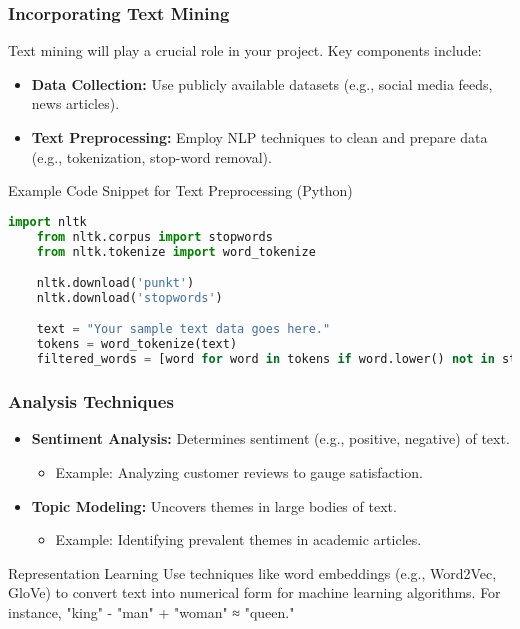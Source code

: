 \documentclass[aspectratio=169]{beamer}
\begin{document}
\begin{frame}[fragile]
    \frametitle{Incorporating Text Mining}
    Text mining will play a crucial role in your project. Key components include:
    \begin{itemize}
        \item \textbf{Data Collection:} Use publicly available datasets (e.g., social media feeds, news articles).
        \item \textbf{Text Preprocessing:} Employ NLP techniques to clean and prepare data (e.g., tokenization, stop-word removal).
    \end{itemize}

    \begin{block}{Example Code Snippet for Text Preprocessing (Python)}
    \begin{lstlisting}[language=Python]
    import nltk
    from nltk.corpus import stopwords
    from nltk.tokenize import word_tokenize

    nltk.download('punkt')
    nltk.download('stopwords')

    text = "Your sample text data goes here."
    tokens = word_tokenize(text)
    filtered_words = [word for word in tokens if word.lower() not in stopwords.words('english')]
    \end{lstlisting}
    \end{block}
\end{frame}

\begin{frame}[fragile]
    \frametitle{Analysis Techniques}
    \begin{itemize}
        \item \textbf{Sentiment Analysis:} Determines sentiment (e.g., positive, negative) of text.
            \begin{itemize}
                \item Example: Analyzing customer reviews to gauge satisfaction.
            \end{itemize}
        \item \textbf{Topic Modeling:} Uncovers themes in large bodies of text.
            \begin{itemize}
                \item Example: Identifying prevalent themes in academic articles.
            \end{itemize}
    \end{itemize}

    \begin{block}{Representation Learning}
        Use techniques like word embeddings (e.g., Word2Vec, GloVe) to convert text into numerical form for machine learning algorithms. For instance, "king" - "man" + "woman" ≈ "queen."
    \end{block}
\end{frame}
\end{document}
